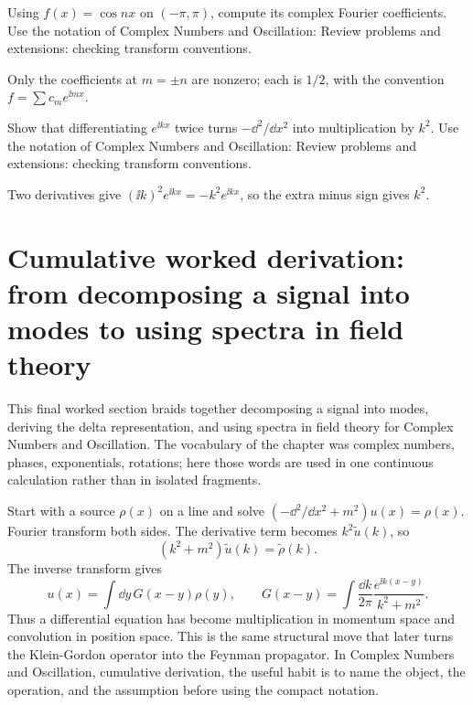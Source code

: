 \begin{exercise}
Using \(f(x)=\cos nx\) on \((-\pi,\pi)\), compute its complex Fourier coefficients.  Use the notation of Complex Numbers and Oscillation: Review problems and extensions: checking transform conventions.
\begin{answer}
Only the coefficients at \(m=\pm n\) are nonzero; each is \(1/2\), with the convention \(f=\sum c_me^{\ii mx}\).
\end{answer}
\end{exercise}

\begin{exercise}
Show that differentiating \(e^{\ii kx}\) twice turns \(-\dd^2/\dd x^2\) into multiplication by \(k^2\).  Use the notation of Complex Numbers and Oscillation: Review problems and extensions: checking transform conventions.
\begin{answer}
Two derivatives give \((\ii k)^2e^{\ii kx}=-k^2e^{\ii kx}\), so the extra minus sign gives \(k^2\).
\end{answer}
\end{exercise}



\section{Cumulative worked derivation: from decomposing a signal into modes to using spectra in field theory}

This final worked section braids together decomposing a signal into modes, deriving the delta representation, and using spectra in field theory for Complex Numbers and Oscillation.  The vocabulary of the chapter was complex numbers, phases, exponentials, rotations; here those words are used in one continuous calculation rather than in isolated fragments.

Start with a source \(\rho(x)\) on a line and solve \((-\dd^2/\dd x^2+m^2)u(x)=\rho(x)\).  Fourier transform both sides.  The derivative term becomes \(k^2\tilde u(k)\), so
\[
  (k^2+m^2)\tilde u(k)=\tilde\rho(k).
\]
The inverse transform gives
\[
  u(x)=\int\dd y\,G(x-y)\rho(y),
  \qquad
  G(x-y)=\int\frac{\dd k}{2\pi}\frac{e^{\ii k(x-y)}}{k^2+m^2}.
\]
Thus a differential equation has become multiplication in momentum space and convolution in position space.  This is the same structural move that later turns the Klein-Gordon operator into the Feynman propagator.  In Complex Numbers and Oscillation, cumulative derivation, the useful habit is to name the object, the operation, and the assumption before using the compact notation.

